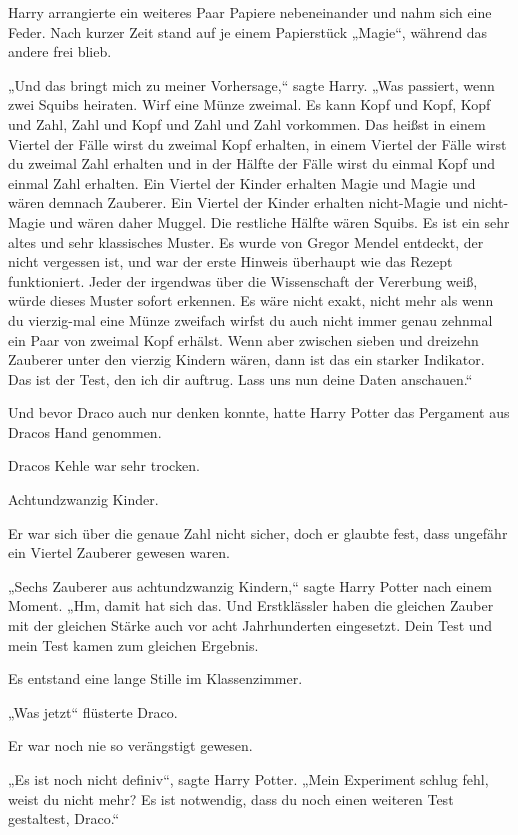 {Harry arrangierte ein weiteres Paar Papiere nebeneinander und nahm sich eine Feder. Nach kurzer Zeit stand auf je einem Papierstück „Magie“, während das andere frei blieb.

„Und das bringt mich zu meiner Vorhersage,“ sagte Harry. „Was passiert, wenn zwei Squibs heiraten. Wirf eine Münze zweimal. Es kann Kopf und Kopf, Kopf und Zahl, Zahl und Kopf und Zahl und Zahl vorkommen. Das heißst in einem Viertel der Fälle wirst du zweimal Kopf erhalten, in einem Viertel der Fälle wirst du zweimal Zahl erhalten und in der Hälfte der Fälle wirst du einmal Kopf und einmal Zahl erhalten. Ein Viertel der Kinder erhalten Magie und Magie und wären demnach Zauberer. Ein Viertel der Kinder erhalten nicht-Magie und nicht-Magie und wären daher Muggel. Die restliche Hälfte wären Squibs. Es ist ein sehr altes und sehr klassisches Muster. Es wurde von Gregor Mendel entdeckt, der nicht vergessen ist, und war der erste Hinweis überhaupt wie das Rezept funktioniert. Jeder der irgendwas über die Wissenschaft der Vererbung weiß, würde dieses Muster sofort erkennen. Es wäre nicht exakt, nicht mehr als wenn du vierzig-mal eine Münze zweifach wirfst du auch nicht immer genau zehnmal ein Paar von zweimal Kopf erhälst. Wenn aber zwischen sieben und dreizehn Zauberer unter den vierzig Kindern wären, dann ist das ein starker Indikator. Das ist der Test, den ich dir auftrug. Lass uns nun deine Daten anschauen.“

Und bevor Draco auch nur denken konnte, hatte Harry Potter das Pergament aus Dracos Hand genommen.

Dracos Kehle war sehr trocken.

Achtundzwanzig Kinder.

Er war sich über die genaue Zahl nicht sicher, doch er glaubte fest, dass ungefähr ein Viertel Zauberer gewesen waren.

„Sechs Zauberer aus achtundzwanzig Kindern,“ sagte Harry Potter nach einem Moment. „Hm, damit hat sich das. Und Erstklässler haben die gleichen Zauber mit der gleichen Stärke auch vor acht Jahrhunderten eingesetzt. Dein Test und mein Test kamen zum gleichen Ergebnis.

Es entstand eine lange Stille im Klassenzimmer.

„Was jetzt“ flüsterte Draco.

Er war noch nie so verängstigt gewesen.

„Es ist noch nicht definiv“, sagte Harry Potter. „Mein Experiment schlug fehl, weist du nicht mehr? Es ist notwendig, dass du noch einen weiteren Test gestaltest, Draco.“

}
